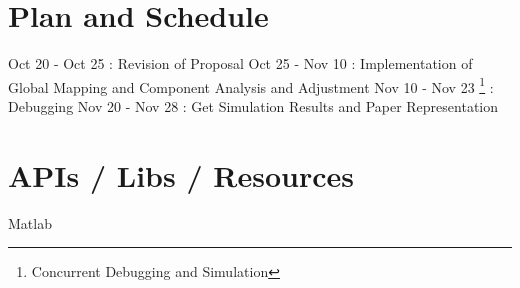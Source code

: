 \documentclass{article}
\begin{document}
\section{Plan and Schedule}
Oct 20 - Oct 25 : Revision of Proposal\newline
Oct 25 - Nov 10 : Implementation of Global Mapping and Component Analysis and Adjustment\newline
Nov 10 - Nov 23 \footnote{Concurrent Debugging and Simulation} : Debugging\newline
Nov 20 - Nov 28 : Get Simulation Results and Paper Representation\newline


\section{APIs / Libs / Resources}
Matlab



\end{document}
